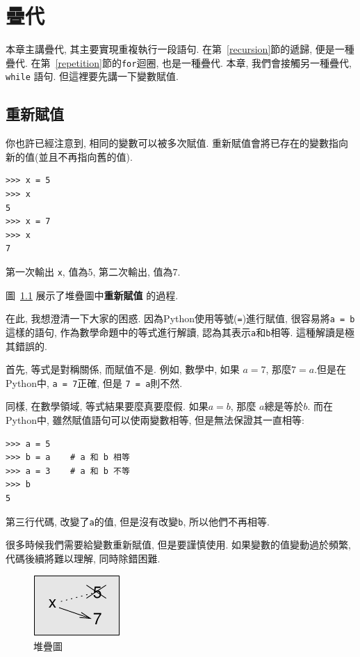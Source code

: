 \documentclass[10pt]{book}
\begin{document}
\chapter{疊代}

本章主講疊代, 其主要實現重複執行一段語句. 
在第~\ref{recursion}節的遞歸, 便是一種疊代. 
在第~\ref{repetition}節的{\tt for}迴圈, 也是一種疊代. 
本章, 我們會接觸另一種疊代, {\tt while} 語句. 
但這裡要先講一下變數賦值. 

\section{重新賦值}

你也許已經注意到, 相同的變數可以被多次賦值. 
重新賦值會將已存在的變數指向新的值(並且不再指向舊的值).

\begin{verbatim}
>>> x = 5
>>> x
5
>>> x = 7
>>> x
7
\end{verbatim}
%
第一次輸出{ \tt x}, 值為5, 第二次輸出, 值為7.

圖~\ref{fig.assign2}  展示了堆疊圖中{\bf 重新賦值}
的過程.  

在此, 我想澄清一下大家的困惑.
因為Python使用等號({\tt =})進行賦值, 
很容易將{\tt a = b}這樣的語句, 作為數學命題中的等式進行解讀, 
認為其表示{\tt a}和{\tt b}相等. 
這種解讀是極其錯誤的. 

首先, 等式是對稱關係, 而賦值不是. 
例如, 數學中, 如果 $a=7$, 那麼$7=a$.但是在Python中, 
{\tt a = 7}正確, 但是 {\tt 7 = a}則不然. 

同樣, 在數學領域, 等式結果要麼真要麼假. 
如果$a=b$, 那麼 $a$總是等於$b$. 
而在Python中, 雖然賦值語句可以使兩變數相等, 但是無法保證其一直相等:

\begin{verbatim}
>>> a = 5
>>> b = a    # a 和 b 相等
>>> a = 3    # a 和 b 不等
>>> b
5
\end{verbatim}
%
第三行代碼, 改變了{\tt a}的值, 但是沒有改變{\tt b}, 所以他們不再相等. 

很多時候我們需要給變數重新賦值, 但是要謹慎使用. 
如果變數的值變動過於頻繁, 代碼後續將難以理解, 同時除錯困難. 

\begin{figure}
\centerline
{\includegraphics[scale=0.8]{figs/assign2.pdf}}
\caption{堆疊圖}
\label{fig.assign2}
\end{figure}
\end{document}
